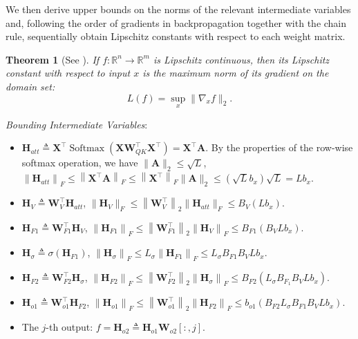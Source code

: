 \documentclass[lettersize,onecolumn]{IEEEtran}
\newtheorem{theorem}{Theorem}
\begin{document}
We then derive upper bounds on the norms of the relevant intermediate variables and, following the order of gradients in backpropagation together with the chain rule, sequentially obtain Lipschitz constants with respect to each weight matrix.

\begin{theorem}[See \cite{virmaux2018lipschitzConstantEstimation}]\label{theorem: get Lipschitz constant}
    If $f: \mathbb{R}^{n}\rightarrow \mathbb{R}^{m}$ is Lipschitz continuous, then its Lipschitz constant with respect to input $x$ is the maximum norm of its gradient on the domain set:
    \begin{equation}
        L(f) = \sup_{x} \|\nabla_x f \|_2.
    \end{equation}
\end{theorem}

\emph{Bounding Intermediate Variables}: 
\begin{itemize}
    \item $\mathbf{H}_{att}\triangleq \mathbf{X}^{\top} \operatorname{Softmax}\left(\mathbf{X} \mathbf{W}_{Q K}^{\top} \mathbf{X}^{\top}\right)=\mathbf{X}^{\top} \mathbf{A}$. By the properties of the row-wise softmax operation, we have $\|\mathbf{A}\|_2 \leq \sqrt{L}$, $\left\|\mathbf{H}_{att}\right\|_{F} \leq\left\|\mathbf{X}^{\top} \mathbf{A}\right\|_{F} \leq\left\|\mathbf{X}^{\top}\right\|_{F}\|\mathbf{A}\|_{2}  \leq (\sqrt{L} b_{x})\sqrt{L}=L b_x$. 
    \item $\mathbf{H}_{V}\triangleq \mathbf{W}_{V}^{\top} \mathbf{H}_{att}$, $\|\mathbf{H}_{V}\|_{F} \leq\left\|\mathbf{W}_{V}^{\top}\right\|_{2}\|\mathbf{H}_{att}\|_{F} \leq B_{V}\left(L b_{x}\right)$.
    \item $\mathbf{H}_{F1}\triangleq \mathbf{W}_{F1}^{\top} \mathbf{H}_{V}$, $\left\|\mathbf{H}_{F1}\right\|_{F} \leq\left\|\mathbf{W}_{F1}^{\top}\right\|_{2}\left\|\mathbf{H}_{V}\right\|_{F} \leq B_{F1}\left(B_{V} L b_{x}\right)$.
    \item $\mathbf{H}_{\sigma}\triangleq\sigma\left(\mathbf{H}_{F1}\right)$, $\left\|\mathbf{H}_{\sigma}\right\|_{F} \leq L_{\sigma}\left\|\mathbf{H}_{F1}\right\|_{F} \leq L_{\sigma} B_{F1} B_{V} L b_{x}$.
    \item $\mathbf{H}_{F2}\triangleq\mathbf{W}_{F2}^{\top} \mathbf{H}_{\sigma}$, $\left\|\mathbf{H}_{F2}\right\|_{F} \leq\left\|\mathbf{W}_{F2}^{\top}\right\|_{2}\left\|\mathbf{H}_{\sigma}\right\|_{F} \leq B_{F2}\left(L_{\sigma} B_{F_{1}} B_{V} L b_{x}\right)$.
    \item $\mathbf{H}_{o1}\triangleq\mathbf{W}_{o1}^{\top} \mathbf{H}_{F2}$, $\left\|\mathbf{H}_{o1}\right\|_{F} \leq\left\|\mathbf{W}_{o1}^{\top}\right\|_{2}\left\|\mathbf{H}_{F2}\right\|_{F} \leq b_{o1}\left(B_{F 2} L_{\sigma} B_{F 1} B_{V} L b_{x}\right)$.
    \item The $j$-th output: $f=\mathbf{H}_{o2}\triangleq \mathbf{H}_{o1} \mathbf{W}_{o2}[:,j]$.
\end{itemize}
\end{document}

